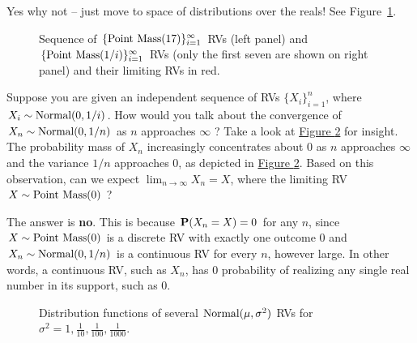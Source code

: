 Yes why not -- just move to space of distributions over the reals! See Figure~\ref{F:SequenceOfPointMassRVS17And1Byi}.

\begin{figure}[htpb]
\caption{Sequence of $\{\mbox{{\rm Point~Mass}}(17)\}_{i=1}^{\infty}$ RVs (left panel) and $\{\mbox{{\rm Point~Mass}}(1/i)\}_{i=1}^{\infty}$ RVs (only the first seven are shown on right panel) and their limiting RVs in red.\label{F:SequenceOfPointMassRVS17And1Byi}}
\centering   {}
\end{figure}

\begin{classwork}\label{CW:Normal01bynConvToPointMass0}
Suppose you are given an independent sequence of RVs $\{X_i \}_{i=1}^n$, where $X_i \sim \mbox{{\rm Normal}}(0,1/i)$.  How would you talk about the convergence of $X_n \sim \mbox{{\rm Normal}}(0,1/n)$ as $n$ approaches $\infty$ ?  Take a look at \hyperref[F:PlotNormal01bynConvToPointMass0]{Figure \ref*{F:PlotNormal01bynConvToPointMass0}} for insight.  The probability mass of $X_n$ increasingly concentrates about $0$ as $n$ approaches $\infty$ and the variance $1/n$ approaches $0$, as depicted in \hyperref[F:PlotNormal01bynConvToPointMass0]{Figure \ref*{F:PlotNormal01bynConvToPointMass0}}.  Based on this observation, can we expect $\lim_{n \rightarrow \infty} X_n = X$, where the limiting RV $X \sim \mbox{{\rm Point~Mass}}(0)$ ?

The answer is {\bf no}.  This is because $\mathbf{P}(X_n=X)=0$ for any $n$, since $X \sim \mbox{{\rm Point~Mass}}(0)$ is a discrete RV with exactly one outcome $0$ and $X_n \sim \mbox{{\rm Normal}}(0,1/n)$ is a continuous RV for every $n$, however large.  In other words, a continuous RV, such as $X_n$, has $0$ probability of realizing any single real number in its support, such as $0$.    
\begin{figure}[htpb]
\caption{Distribution functions of several $\mbox{{\rm Normal}}(\mu,\sigma^2)$ RVs for $\sigma^2 = 1,\frac{1}{10},\frac{1}{100},\frac{1}{1000}$.\label{F:PlotNormal01bynConvToPointMass0}}
\centering   {}
\end{figure}
\end{classwork}

